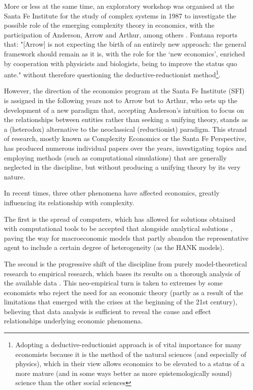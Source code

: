 \documentclass[a4paper, headings=standardclasses]{scrartcl}
\begin{document}
More or less at the same time, an exploratory workshop was organised at the Santa Fe Institute for the study of complex systems in 1987 to investigate the possible role of the emerging complexity theory in economics, with the participation of Anderson, Arrow and Arthur, among others \parencite{fontana2010a}.
Fontana reports that: "[Arrow] is not expecting the birth of an entirely new approach: the general framework should remain as it is, with the role for the `new economics', enriched by cooperation with physicists and biologists, being to improve the status quo ante." \parencite{fontana2010a} without therefore questioning the deductive-reductionist method\footnote{Adopting a deductive-reductionist approach is of vital importance for many economists because it is the method of the natural sciences (and especially of physics), which in their view allows economics to be elevated to a status of a more mature (and in some ways better as more epistemologically sound) science than the other social sciences}.

However, the direction of the economics program at the Santa Fe Institute (SFI) is assigned in the following years not to Arrow but to Arthur, who sets up the development of a new paradigm that, accepting Anderson's intuition to focus on the relationships between entities rather than seeking a unifying theory, stands as a (heterodox) alternative to the neoclassical (reductionist) paradigm.
This strand of research, mostly known as Complexity Economics or the Santa Fe Perspective, has produced numerous individual papers over the years, investigating topics and employing methods (such as computational simulations) that are generally neglected in the discipline, but without producing a unifying theory by its very nature.

In recent times, three other phenomena have affected economics, greatly influencing its relationship with complexity.

The first is the spread of computers, which has allowed for solutions obtained with computational tools to be accepted that alongside analytical solutions \parencite{cherrier2023, backhouse2016}, paving the way for macroeconomic models that partly abandon the representative agent to include a certain degree of heterogeneity (as the HANK models).

The second is the progressive shift of the discipline from purely model-theoretical research to empirical research, which bases its results on a thorough analysis of the available data \parencite{cherrier2018, backhouse2017}.
This neo-empirical turn is taken to extremes by some economists who reject the need for an economic theory (partly as a result of the limitations that emerged with the crises at the beginning of the 21st century), believing that data analysis is sufficient to reveal the cause and effect relationships underlying economic phenomena.
\end{document}
